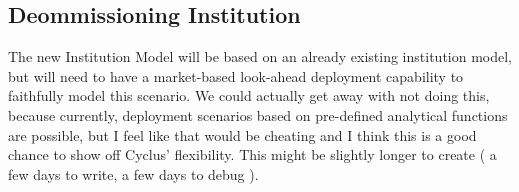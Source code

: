 
\subsection{Deommissioning Institution}

The new Institution Model will be based on an already existing institution
model, but will need to have a market-based look-ahead deployment capability to
faithfully model this scenario. We could actually get away with not doing this,
because currently, deployment scenarios based on pre-defined analytical
functions are possible, but I feel like that would be cheating and I think this
is a good chance to show off Cyclus' flexibility. This might be slightly longer
to create ( a few days to write, a few days to debug ).
